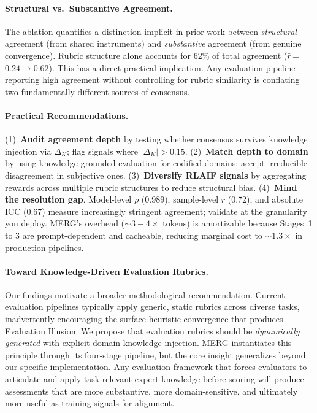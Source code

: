 \documentclass{article}
\begin{document}
\paragraph{Structural vs.\ Substantive Agreement.}
The ablation quantifies a distinction implicit in prior work between \textit{structural} agreement (from shared instruments) and \textit{substantive} agreement (from genuine convergence). Rubric structure alone accounts for 62\% of total agreement ($\bar{r}$\,=\,$0.24 \rightarrow 0.62$). This has a direct practical implication. Any evaluation pipeline reporting high agreement without controlling for rubric similarity is conflating two fundamentally different sources of consensus.

\paragraph{Practical Recommendations.}
(1)~\textbf{Audit agreement depth} by testing whether consensus survives knowledge injection via $\Delta_K$; flag signals where $|\Delta_K| > 0.15$.
(2)~\textbf{Match depth to domain} by using knowledge-grounded evaluation for codified domains; accept irreducible disagreement in subjective ones.
(3)~\textbf{Diversify RLAIF signals} by aggregating rewards across multiple rubric structures to reduce structural bias.
(4)~\textbf{Mind the resolution gap}. Model-level $\rho$ (0.989), sample-level $r$ (0.72), and absolute ICC (0.67) measure increasingly stringent agreement; validate at the granularity you deploy.
MERG's overhead ($\sim$$3{-}4\times$ tokens) is amortizable because Stages~1 to 3 are prompt-dependent and cacheable, reducing marginal cost to $\sim$$1.3\times$ in production pipelines.

\paragraph{Toward Knowledge-Driven Evaluation Rubrics.}
Our findings motivate a broader methodological recommendation. Current evaluation pipelines typically apply generic, static rubrics across diverse tasks, inadvertently encouraging the surface-heuristic convergence that produces Evaluation Illusion. We propose that evaluation rubrics should be \textit{dynamically generated} with explicit domain knowledge injection. MERG instantiates this principle through its four-stage pipeline, but the core insight generalizes beyond our specific implementation. Any evaluation framework that forces evaluators to articulate and apply task-relevant expert knowledge before scoring will produce assessments that are more substantive, more domain-sensitive, and ultimately more useful as training signals for alignment.
\end{document}
